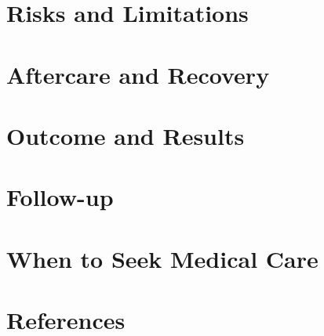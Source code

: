 \section*{Risks and Limitations}

\section*{Aftercare and Recovery}

\section*{Outcome and Results}

\section*{Follow-up}

\section*{When to Seek Medical Care}

\section*{References}
\begin{enumerate}
\end{enumerate}

\clearpage
